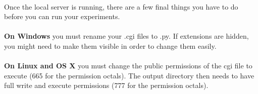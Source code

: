 \paragraph{}
Once the local server is running, there are a few final things you have to do before you can run your experiments.

\paragraph{}
\begin{tcolorbox}[breakable,colback=white,colframe=blue,width=\dimexpr\textwidth+12mm\relax,enlarge left by=-6mm,enlarge right by=6mm]
\textbf{On Windows} you must rename your .cgi files to .py.  If extensions are hidden, you might need to make them visible in order to change them easily.
\end{tcolorbox}

\paragraph{}
\begin{tcolorbox}[breakable,colback=white,colframe=green,width=\dimexpr\textwidth+12mm\relax,enlarge left by=-6mm,enlarge right by=6mm]
\textbf{On Linux and OS X} you must change the public permissions of the cgi file to execute (665 for the permission octals).  The output directory then needs to have full write and execute permissions (777 for the permission octals).
\end{tcolorbox}


